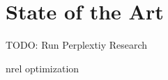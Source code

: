 
\chapter{State of the Art}\label{chapter:state_of_the_art}


TODO: Run Perplextiy Research

nrel optimization